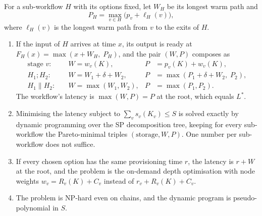 For a sub-workflow $H$ with its options fixed, let $W_H$ be its longest warm path and
\[
  P_H = \max_{v \in H} \bigl(p_v + \ell_H(v)\bigr),
\]
where $\ell_H(v)$ is the longest warm path from $v$ to the exits of $H$.

\begin{theorem}
\label{thm:joint}
\begin{enumerate}[label=(\alph*)]
  \item If the input of $H$ arrives at time $x$, its output is ready at
        $F_H(x) = \max(x + W_H,\; P_H)$, and the pair $(W, P)$ composes as
        \begin{align*}
          \text{stage } v:&\quad W = w_v(K), & P &= p_v(K) + w_v(K), \\
          H_1 ; H_2:&\quad W = W_1 + \delta + W_2, & P &= \max(P_1 + \delta + W_2,\; P_2), \\
          H_1 \parallel H_2:&\quad W = \max(W_1, W_2), & P &= \max(P_1, P_2).
        \end{align*}
        The workflow's latency is $\max(W, P) = P$ at the root, which equals $L^*$.
  \item Minimising the latency subject to $\sum_v s_v(K_v) \le S$ is solved exactly by dynamic
        programming over the SP decomposition tree, keeping for every sub-workflow the
        Pareto-minimal triples $(\text{storage}, W, P)$. One number per sub-workflow does not
        suffice.
  \item If every chosen option has the same provisioning time $r$, the latency is $r + W$ at the
        root, and the problem is the on-demand depth optimisation with node weights
        $w_v = R_v(K) + C_v$ instead of $r_v + R_v(K) + C_v$.
  \item The problem is NP-hard even on chains, and the dynamic program is pseudo-polynomial in
        $S$.
\end{enumerate}
\end{theorem}

